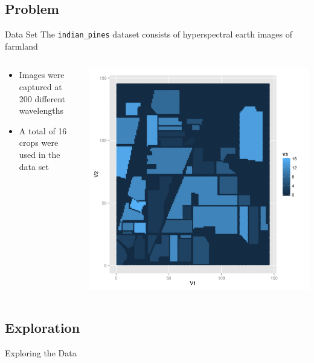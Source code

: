 \documentclass[11pt]{beamer}
\begin{document}
\subsection{Problem}
\begin{frame}{Data Set}
The \texttt{indian\_pines} dataset consists of hyperspectral earth images of farmland
\begin{columns}[T]
\begin{column}{.48\textwidth}
\begin{itemize}
\item Images were captured at 200 different wavelengths
\item A total of 16 crops were used in the data set
\end{itemize}
\end{column}
\hfill
\begin{column}{.48\textwidth}
\includegraphics[scale=.3]{gt.png}
\end{column}
\end{columns}
\end{frame}

\subsection{Exploration}
\begin{frame}{Exploring the Data}
\begin{center}
\end{center}
\end{frame}
\end{document}
